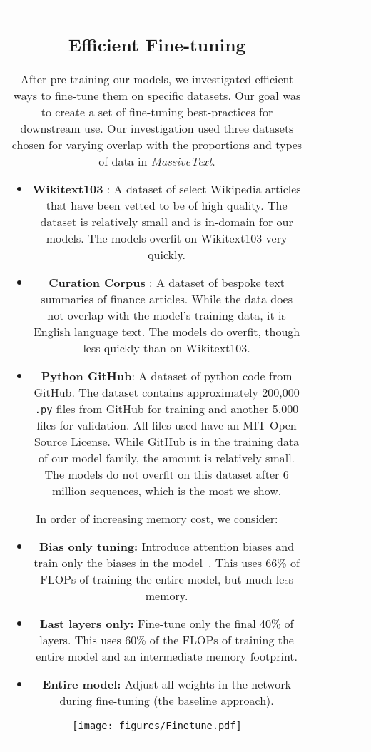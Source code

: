 \documentclass[11pt, a4paper, logo, internal, copyright, nonumbering]{deepmind}
\newcommand{\massivetext}{\textit{MassiveText}\xspace}
\begin{document}
\begin{center}
\begin{longtable}{cclccc}
{\subsection{Efficient Fine-tuning}
\label{app:finetuning}
After pre-training our models, we investigated efficient ways to fine-tune them on specific datasets.
Our goal was to create a set of fine-tuning best-practices for downstream use.
Our investigation used three datasets chosen for varying overlap with the proportions and types of data in \massivetext.
\begin{itemize}
    \item \textbf{Wikitext103} \citep{wikitext103}: A dataset of select Wikipedia articles that have been vetted to be of high quality. The dataset is relatively small and is in-domain for our models. 
    The models overfit on Wikitext103 very quickly. 
    \item \textbf{Curation Corpus} \citep{curationcorpusbase2020}: A dataset of bespoke text summaries of finance articles. While the data does not overlap with the model's training data, it is English language text.
    The models do overfit, though less quickly than on Wikitext103.
    \item \textbf{Python GitHub}: A dataset of python code from GitHub.
    The dataset contains approximately 200,000 \texttt{.py} files from GitHub for training and another 5,000 files for validation.
    All files used have an MIT Open Source License.
    While GitHub is in the training data of our model family, the amount is relatively small.
    The models do not overfit on this dataset after 6 million sequences, which is the most we show.
\end{itemize}
In order of increasing memory cost, we consider:
\begin{itemize}
    \item {\bf Bias only tuning:} Introduce attention biases and train only the biases in the model~\citep{ben2021bitfit}. This uses 66\% of FLOPs of training the entire model, but much less memory.
    \item {\bf Last layers only:} Fine-tune only the final 40\% of layers. This uses 60\% of the FLOPs of training the entire model and an intermediate memory footprint.
    \item {\bf Entire model:} Adjust all weights in the network during fine-tuning (the baseline approach).
\end{itemize}
\begin{figure*}[t]
    \centering
    \texttt{[image: figures/Finetune.pdf]}

\end{figure*}}
\end{longtable}
\end{center}
\end{document}
